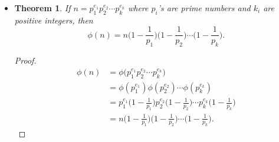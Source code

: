\documentclass{article}
\newtheorem{theorem}[lemma]{Theorem}
\begin{document}
\begin{itemize}
\begin{proof}
        Next, we show that $|M \times N| \leq |MN|.$ Let $(a,b) \in M \times N$.
        By the Chinese Remainder theorem, there exists a unique $x$ modulo $mn$
        such that $x \equiv a \pmod{m}$ and $x \equiv b \pmod{n}.$ We claim that
        $\gcd(x, mn) = 1$. Otherwise, let us say that $\gcd(x, mn) = d > 1.$
        Since $d\ |\ mn$ and $\gcd(m,n) = 1$, then $d$ divides either $m$ or
        $n.$ Let us say $d\ |\ m.$ Then, $d \leq \gcd(x, m) = \gcd(x \mod m, m) = \gcd(a, m),$
        which is impossible because $\gcd(a,m) = 1.$ Hence, $x \in MN$, and
        we can send $(a,b)$ to $x$ to have an injection from $M \times N$ to $MN.$
      \end{proof}
      
    \item
      \begin{theorem}
        If $n = p_1^{e_1} p_2^{e_2} \dotsm p_k^{e_k}$ where $p_i$'s are prime numbers
        and $k_i$ are positive integers, then
        $$\phi(n) = n \Big( 1 - \frac{1}{p_1} \Big) \Big( 1 - \frac{1}{p_2} \Big) \dotsm \Big( 1 - \frac{1}{p_k} \Big).$$
      \end{theorem}
      \begin{proof}
        \begin{align*}
          \phi(n)
          &= \phi \big( p_1^{e_1} p_2^{e_2} \dotsm p_k^{e_k} \big) \\
          &= \phi( p_1^{e_1} ) \phi( p_2^{e_2} ) \dotsm \phi( p_k^{e_k} ) \\
          &= p_1^{e_1} \Big( 1 - \frac{1}{p_1} \Big) p_2^{e_2} \Big( 1 - \frac{1}{p_2} \Big) \dotsm p_k^{e_k} \Big( 1 - \frac{1}{p_k} \Big) \\
          &= n \Big( 1 - \frac{1}{p_1} \Big) \Big( 1 - \frac{1}{p_2} \Big) \dotsm \Big( 1 - \frac{1}{p_k} \Big).
        \end{align*}
      \end{proof}
  \end{itemize}
  
\end{document}
